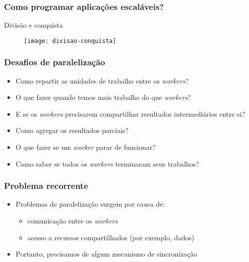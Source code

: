 \documentclass[Ligatures=TeX,table,brazil,svgnames,usetotalslideindicator,comp
ress,10pt]{beamer}
\begin{document}
\begin{frame}
  \frametitle{Como programar aplicações escaláveis?}

  Divisão e conquista

  \begin{figure}
    \centering
    \texttt{[image: divisao-conquista]}
  \end{figure}

\end{frame}

\begin{frame}
  \frametitle{Desafios de paralelização}
  \begin{itemize}
  \item Como repartir as unidades de trabalho entre os \textit{workers}?
  \item O que fazer quando temos mais trabalho do que \textit{workers}?
  \item E se os \textit{workers} precisarem compartilhar resultados
    intermediários entre si?
  \item Como agregar os resultados parciais?
  \item O que fazer se um \textit{worker} parar de funcionar?
  \item Como saber se todos os \textit{workers} terminaram seus trabalhos?
  \end{itemize}
\end{frame}

\begin{frame}
  \frametitle{Problema recorrente}

  \begin{itemize}
  \item Problemas de paralelização surgem por causa de:
    \begin{itemize}
    \item comunicação entre os \textit{workers}
    \item acesso a recursos compartilhados (por exemplo, dados)
    \end{itemize}
  \item Portanto, precisamos de algum mecanismo de sincronização
  \end{itemize}

\end{frame}
\end{document}
